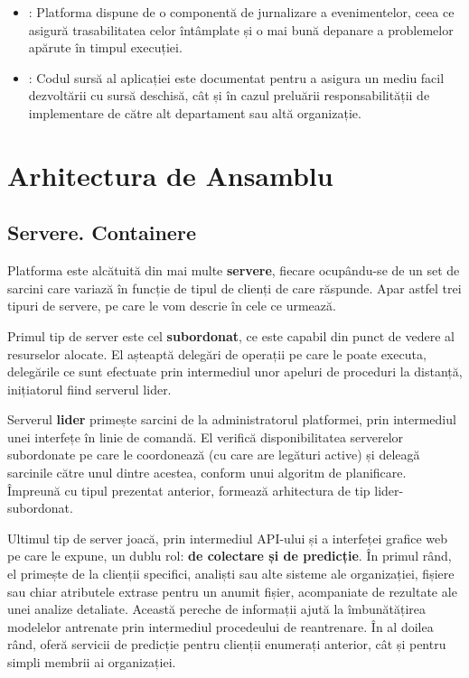 \documentclass[../../main.tex]{subfiles}
\begin{document}
\begin{itemize}
    \item {}: Platforma dispune de o componentă de jurnalizare a evenimentelor, ceea ce asigură trasabilitatea celor întâmplate și o mai bună depanare a problemelor apărute în timpul execuției.
    \item {}: Codul sursă al aplicației este documentat pentru a asigu\-ra un mediu facil dezvoltării cu sursă deschisă, cât și în cazul preluării responsabilității de implementare de către alt departament sau altă organi\-zație.
\end{itemize}

\section{Arhitectura de Ansamblu}
\label{sec:platform_arhitecture}

\subsection{Servere. Containere}

Platforma este alcătuită din mai multe \textbf{servere}, fiecare ocupându-se de un set de sarcini care variază în funcție de tipul de clienți de care răspunde. Apar astfel trei tipuri de servere, pe care le vom descrie în cele ce urmează.

Primul tip de server este cel \textbf{subordonat}, ce este capabil din punct de vedere al resurselor alocate. El așteaptă delegări de operații pe care le poate executa, delegările ce sunt efectuate prin intermediul unor apeluri de proceduri la distanță, inițiatorul fiind serverul lider.

Serverul \textbf{lider} primește sarcini de la administratorul platformei, prin intermediul unei interfețe în linie de comandă. El verifică disponibilitatea serverelor subordonate pe care le coordonează (cu care are legături active) și deleagă sarcinile către unul dintre acestea, conform unui algoritm de planificare. Împre\-ună cu tipul prezentat anterior, formează arhitectura de tip lider-subordonat.

Ultimul tip de server joacă, prin intermediul API-ului și a interfeței grafice web pe care le expune, un dublu rol: \textbf{de colectare și de predicție}. În primul rând, el primește de la clienții specifici, analiști sau alte sisteme ale organizației, fișiere sau chiar atributele extrase pentru un anumit fișier, acompaniate de rezultate ale unei analize detaliate. Această pereche de informații ajută la îmbunătățirea modelelor antrenate prin intermediul procedeului de reantrenare. În al doilea rând, oferă servicii de predicție pentru clienții enumerați anterior, cât și pentru simpli membrii ai organizației.
\end{document}
